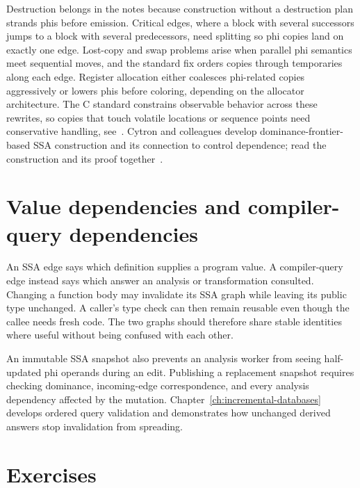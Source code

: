 Destruction belongs in the notes because construction without a destruction plan strands phis before emission.
Critical edges, where a block with several successors jumps to a block with several predecessors, need splitting so phi copies land on exactly one edge.
Lost-copy and swap problems arise when parallel phi semantics meet sequential moves, and the standard fix orders copies through temporaries along each edge.
Register allocation either coalesces phi-related copies aggressively or lowers phis before coloring, depending on the allocator architecture.
The C standard constrains observable behavior across these rewrites, so copies that touch volatile locations or sequence points need conservative handling, see~\cite{wg14-2011-c11}.
Cytron and colleagues develop dominance-frontier-based SSA construction and its connection to control dependence; read the construction and its proof together~\cite{cytron-1991-ssa}.

\section{Value dependencies and compiler-query dependencies}
\label{sec:ch12-query-dependencies}

An SSA edge says which definition supplies a program value.
A compiler-query edge instead says which answer an analysis or transformation consulted.
Changing a function body may invalidate its SSA graph while leaving its public type unchanged.
A caller's type check can then remain reusable even though the callee needs fresh code.
The two graphs should therefore share stable identities where useful without being confused with each other.

An immutable SSA snapshot also prevents an analysis worker from seeing half-updated phi operands during an edit.
Publishing a replacement snapshot requires checking dominance, incoming-edge correspondence, and every analysis dependency affected by the mutation.
Chapter~\ref{ch:incremental-databases} develops ordered query validation and demonstrates how unchanged derived answers stop invalidation from spreading.

\section{Exercises}
\label{sec:ch12-exercises}


